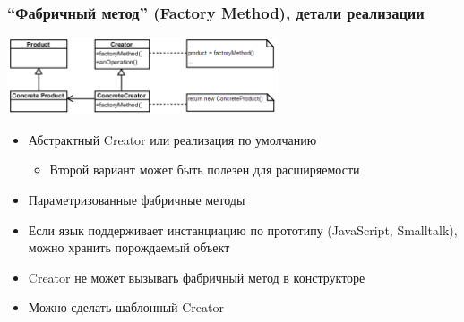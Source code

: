 \documentclass[xetex,mathserif,serif]{beamer}
\begin{document}
	\begin{frame}
		\frametitle{``Фабричный метод'' (Factory Method), детали реализации}
		\begin{center}
			\includegraphics[width=0.6\textwidth]{factoryMethod.png}
		\end{center}
		\begin{itemize}
			\item Абстрактный Creator или реализация по умолчанию
			\begin{itemize}
				\item Второй вариант может быть полезен для расширяемости
			\end{itemize}
			\item Параметризованные фабричные методы
			\item Если язык поддерживает инстанциацию по прототипу (JavaScript, Smalltalk), можно хранить порождаемый объект
			\item Creator не может вызывать фабричный метод в конструкторе
			\item Можно сделать шаблонный Creator
		\end{itemize}
	\end{frame}
\end{document}
